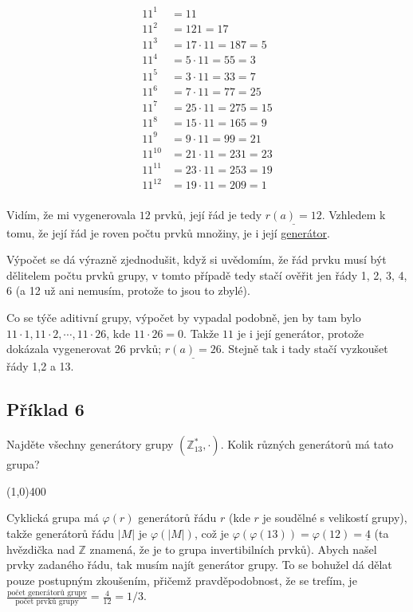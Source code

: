 \documentclass{article}
\begin{document}
\begin{align*}
11^1 & = 11\\
11^2 & = 121 = 17\\
11^3 & = 17\cdot 11 = 187 = 5\\
11^4 & = 5\cdot 11 = 55 = 3\\
11^5 & = 3\cdot 11 = 33 = 7\\
11^6 & = 7\cdot 11 = 77 = 25\\
11^7 & = 25\cdot 11 = 275 = 15\\
11^8 & = 15\cdot 11 = 165 = 9\\
11^9 & = 9\cdot 11 = 99 = 21\\
11^{10} & = 21\cdot 11 = 231 = 23\\
11^{11} & = 23\cdot 11 = 253 = 19\\
11^{12} & = 19\cdot 11 = 209 = 1\\
\end{align*}

Vidím, že mi vygenerovala $12$ prvků, její řád je tedy $\underline{r(a) = 12}$. Vzhledem k tomu, že její řád je roven počtu prvků množiny, je i její \underline{generátor}.

Výpočet se dá výrazně zjednodušit, když si uvědomím, že řád prvku musí být dělitelem počtu prvků grupy, v tomto případě tedy stačí ověřit jen řády 1, 2, 3, 4, 6 (a 12 už ani nemusím, protože to jsou to zbylé).
 
Co se týče aditivní grupy, výpočet by vypadal podobně, jen by tam bylo $11\cdot 1, 11\cdot 2, \cdots, 11\cdot 26$, kde $11\cdot 26 = 0$. Takže $11$ je i její generátor, protože dokázala vygenerovat 26 prvků; $\underline{r(a) = 26}$. Stejně tak i tady stačí vyzkoušet řády 1,2 a 13.

\subsection{\label{priklad1-6}Příklad 6}
Najděte všechny generátory grupy $(\mathbb{Z}_{13}^{*},\cdot)$. Kolik různých generátorů má tato grupa?

\line(1,0){400}

Cyklická grupa má $\varphi(r)$ generátorů řádu $r$ (kde $r$ je soudělné s velikostí grupy), takže generátorů řádu $|M|$ je $\varphi(|M|)$, což je $\varphi(\varphi(13)) = \varphi(12) = \underline{4}$ (ta hvězdička nad $\mathbb{Z}$ znamená, že je to grupa invertibilních prvků). Abych našel prvky zadaného řádu, tak musím najít generátor grupy. To se bohužel dá dělat pouze postupným zkoušením, přičemž pravděpodobnost, že se trefím, je $\frac{\mbox{počet generátorů grupy}}{\mbox{počet prvků grupy}} = \frac{4}{12} = 1/3$.
\end{document}
